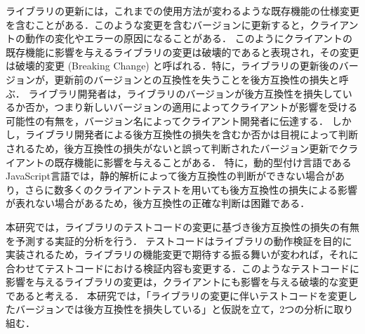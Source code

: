\documentclass[submit]{ipsj}
\begin{document}

ライブラリの更新には，これまでの使用方法が変わるような既存機能の仕様変更を含むことがある．このような変更を含むバージョンに更新すると，クライアントの動作の変化やエラーの原因になることがある．
このようにクライアントの既存機能に影響を与えるライブラリの変更は破壊的であると表現され，その変更は破壊的変更 (Breaking Change) と呼ばれる．特に，ライブラリの更新後のバージョンが，更新前のバージョンとの互換性を失うことを後方互換性の損失と呼ぶ．
ライブラリ開発者は，ライブラリのバージョンが後方互換性を損失しているか否か，つまり新しいバージョンの適用によってクライアントが影響を受ける可能性の有無を，バージョン名によってクライアント開発者に伝達する．
しかし，ライブラリ開発者による後方互換性の損失を含むか否かは目視によって判断されるため，後方互換性の損失がないと誤って判断されたバージョン更新でクライアントの既存機能に影響を与えることがある．
特に，動的型付け言語であるJavaScript言語では，静的解析によって後方互換性の判断ができない場合があり，さらに数多くのクライアントテストを用いても後方互換性の損失による影響が表れない場合があるため，後方互換性の正確な判断は困難である\cite{type-regression-testing}\cite{model-based-testing}．

本研究では，ライブラリのテストコードの変更に基づき後方互換性の損失の有無を予測する実証的分析を行う．
テストコードはライブラリの動作検証を目的に実装されるため，ライブラリの機能変更で期待する振る舞いが変われば，それに合わせてテストコードにおける検証内容も変更する．このようなテストコードに影響を与えるライブラリの変更は，クライアントにも影響を与える破壊的な変更であると考える．
本研究では，「ライブラリの変更に伴いテストコードを変更したバージョンでは後方互換性を損失している」と仮説を立て，2つの分析に取り組む．
\end{document}
